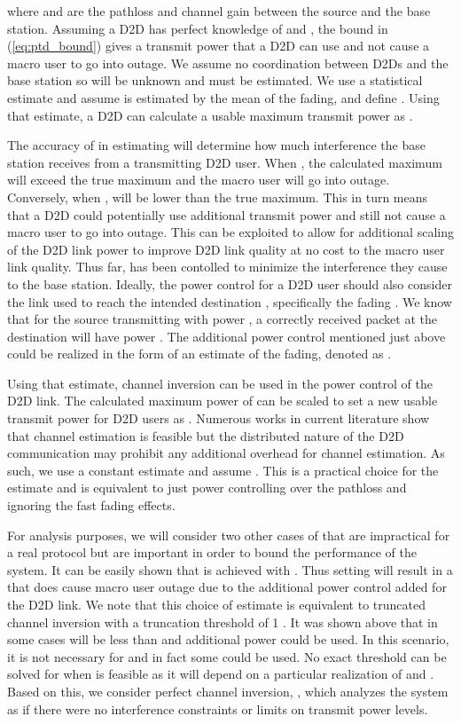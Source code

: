 \documentclass[10pt, final, journal, letterpaper,oneside, twocolumn]{IEEEtran}
\begin{document}
where  and  are the pathloss and channel gain between the source and the base station.  Assuming a D2D has perfect knowledge of  and , the bound in (\ref{eq:ptd_bound}) gives a transmit power that a D2D can use and not cause a macro user to go into outage.  We assume no coordination between D2Ds and the base station so  will be unknown and must be estimated.  We use a statistical estimate and assume  is estimated by the mean of the fading, and define .  Using that estimate, a D2D can calculate a usable maximum transmit power as .  

The accuracy of  in estimating  will determine how much interference the base station receives from a transmitting D2D user.  When , the calculated maximum  will exceed the true maximum  and the macro user will go into outage.  Conversely, when ,  will be lower than the true maximum.  This in turn means that a D2D could potentially use  additional transmit power and still not cause a macro user to go into outage.  This can be exploited to allow for additional scaling of the D2D link power to improve D2D link quality at no cost to the macro user link quality.  Thus far,  has been contolled to minimize the interference they cause to the base station.  Ideally, the power control for a D2D user should also consider the link used to reach the intended destination , specifically the fading .  We know that for the source transmitting with power , a correctly received packet at the destination will have power .  The additional power control mentioned just above could be realized in the form of an estimate of the fading, denoted as .  

Using that estimate, channel inversion can be used in the power control of the D2D link.  The calculated maximum power of  can be scaled to set a new usable transmit power for D2D users as .  Numerous works in current literature show that channel estimation is feasible but the distributed nature of the D2D communication may prohibit any additional overhead for channel estimation.  As such, we use a constant estimate and assume .  This is a practical choice for the estimate and is equivalent to just power controlling over the pathloss and ignoring the fast fading effects.  

For analysis purposes, we will consider two other cases of   that are impractical for a real protocol but are important  in order to bound the performance of the system.  It can be easily shown that  is achieved with .  Thus setting  will result in a  that does cause macro user outage due to the additional power control added for the D2D link.  We note that this choice of estimate is equivalent to truncated channel inversion with a truncation threshold of 1 \cite{goldsmith_book}.  It was shown above that in some cases  will be less than  and additional power could be used.  In this scenario, it is not necessary for  and in fact some  could be used.  No exact threshold can be solved for when  is feasible as it will depend on a particular realization of  and  . Based on this, we consider perfect channel inversion, , which analyzes the system as if there were no interference constraints or limits on transmit power levels. 
\end{document}
